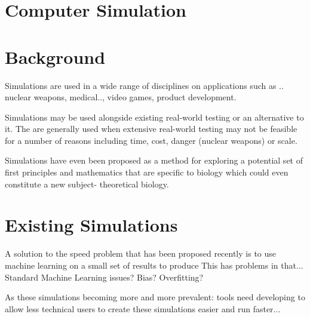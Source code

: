 \documentclass{UoYCSproject}
\begin{document}

\section{Computer Simulation}
\section{Background}
Simulations are used in a wide range of disciplines on applications such as .. nuclear weapons, medical.., video games, product development.

Simulations may be used alongside existing real-world testing or an alternative to it.
The are generally used when extensive real-world testing may not be feasible for a number of reasons including time, cost, danger (nuclear weapons) or scale.

Simulations have even been proposed as a method for exploring a potential set of first principles and mathematics that are specific to biology which could even constitute a new subject- theoretical biology.\cite{rise_article}



\section{Existing Simulations}


A solution to the speed problem that has been proposed recently is to use machine learning on a small set of results to produce 
This has problems in that...
Standard Machine Learning issues? Bias? Overfitting?

As these simulations becoming more and more prevalent: tools need developing to allow less technical users to create these simulations easier and run faster...
\end{document}
